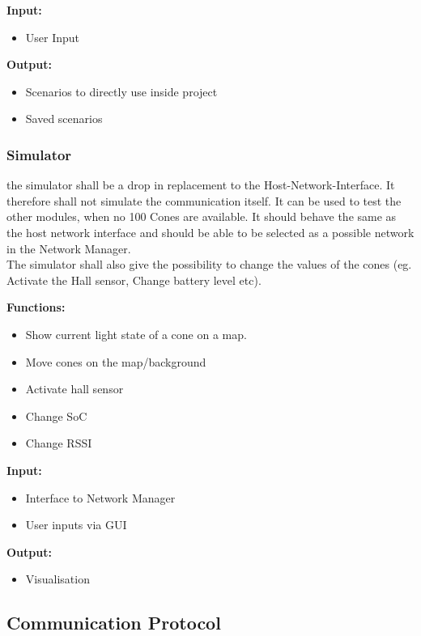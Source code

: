 \textbf{Input:}
\begin{itemize}
	\item User Input
\end{itemize}

\textbf{Output:}
\begin{itemize}
	\item Scenarios to directly use inside project
	\item Saved scenarios
\end{itemize}

\subsubsection{Simulator}
the simulator shall be a drop in replacement to the Host-Network-Interface. It therefore shall not simulate the communication itself. It can be used to test the other modules, when no 100 Cones are available. It should behave the same as the host network interface and should be able to be selected as a possible network in the Network Manager. \\
The simulator shall also give the possibility to change the values of the cones (eg. Activate the Hall sensor, Change battery level etc).

\textbf{Functions: }
\begin{itemize}
	\item Show current light state of a cone on a map. 
	\item Move cones on the map/background
	\item Activate hall sensor
	\item Change \ac{SoC}
	\item Change \ac{RSSI}
\end{itemize}

\textbf{Input:}
\begin{itemize}
	\item Interface to Network Manager
	\item User inputs via \ac{GUI}
\end{itemize}

\textbf{Output:}

\begin{itemize}
	\item Visualisation
\end{itemize}

\subsection{Communication Protocol}

